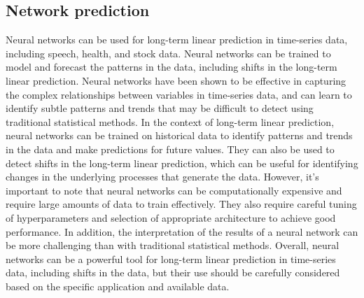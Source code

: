     \subsection{Network prediction} \label{subsec:nnprediction}
    Neural networks can be used for long-term linear prediction in time-series data, including speech, health, and stock data.
    Neural networks can be trained to model and forecast the patterns in the data, including shifts in the long-term linear prediction.
    Neural networks have been shown to be effective in capturing the complex relationships between variables in time-series data,
    and can learn to identify subtle patterns and trends that may be difficult to detect using traditional statistical methods.
    In the context of long-term linear prediction, neural networks can be trained on historical data to identify patterns and trends in the
    data and make predictions for future values. They can also be used to detect shifts in the long-term linear prediction, which can be useful for
    identifying changes in the underlying processes that generate the data.
    However, it's important to note that neural networks can be computationally expensive and require large amounts of data to train effectively. 
    They also require careful tuning of hyperparameters and selection of appropriate architecture to achieve good performance.
    In addition, the interpretation of the results of a neural network can be more challenging than with traditional statistical methods.
    Overall, neural networks can be a powerful tool for long-term linear prediction in time-series data, including shifts in the data,
    but their use should be carefully considered based on the specific application and available data.

